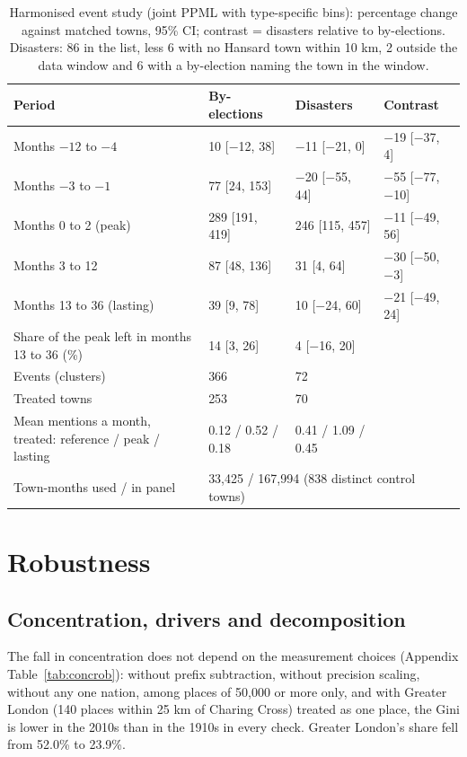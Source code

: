 \documentclass[11pt,a4paper]{article}
\begin{document}
\begin{table}[tbp]\centering\footnotesize\caption{Harmonised event study (joint PPML with type-specific bins): percentage change against matched towns, 95\% CI; contrast = disasters relative to by-elections. Disasters: 86 in the list, less 6 with no Hansard town within 10 km, 2 outside the data window and 6 with a by-election naming the town in the window.}\label{tab:shocks}\begin{tabular}{p{5.2cm}lll}\toprule Period & By-elections & Disasters & Contrast\\\midrule
Months $-12$ to $-4$ & 10 [$-$12, 38] & $-$11 [$-$21, 0] & $-$19 [$-$37, 4]\\
Months $-3$ to $-1$ & 77 [24, 153] & $-$20 [$-$55, 44] & $-$55 [$-$77, $-$10]\\
Months 0 to 2 (peak) & 289 [191, 419] & 246 [115, 457] & $-$11 [$-$49, 56]\\
Months 3 to 12 & 87 [48, 136] & 31 [4, 64] & $-$30 [$-$50, $-$3]\\
Months 13 to 36 (lasting) & 39 [9, 78] & 10 [$-$24, 60] & $-$21 [$-$49, 24]\\
\midrule Share of the peak left in months 13 to 36 (\%) & 14 [3, 26] & 4 [$-$16, 20] & \\
Events (clusters) & 366 & 72 & \\
Treated towns & 253 & 70 & \\
Mean mentions a month, treated: reference / peak / lasting & 0.12 / 0.52 / 0.18 & 0.41 / 1.09 / 0.45 & \\
Town-months used / in panel & \multicolumn{3}{l}{33,425 / 167,994 (838 distinct control towns)}\\
\bottomrule\end{tabular}\end{table}

\section{Robustness}\label{sec:robust}
\subsection{Concentration, drivers and decomposition}
The fall in concentration does not depend on the measurement choices (Appendix Table~\ref{tab:concrob}): without prefix subtraction, without precision scaling, without any one nation, among places of 50,000 or more only, and with Greater London (140 places within 25 km of Charing Cross) treated as one place, the Gini is lower in the 2010s than in the 1910s in every check. Greater London's share fell from 52.0\% to 23.9\%.
\end{document}
